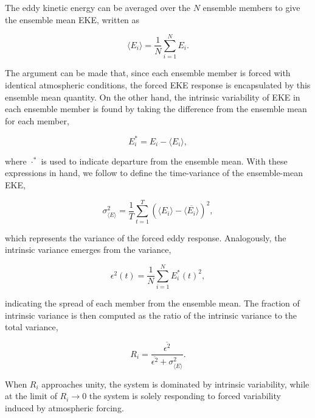 \documentclass[linenumbers]{agujournal2019}
\begin{document}
The eddy kinetic energy can be averaged over the $N$ ensemble members to give the ensemble mean EKE, written as
\begin{linenomath*}
\begin{equation}
\langle E_i \rangle = \frac{1}{N} \sum_{i=1}^N E_i.
\end{equation}
\end{linenomath*}
The argument can be made that, since each ensemble member is forced with identical atmospheric conditions, the forced EKE response is encapsulated by this ensemble mean quantity.
On the other hand, the intrinsic variability of EKE in each ensemble member is found by taking the difference from the ensemble mean for each member,
\begin{linenomath*}
\begin{equation}
E_i^* = E_i - \langle E_i \rangle,
\end{equation}
\end{linenomath*}
where $\cdot^*$ is used to indicate departure from the ensemble mean.
With these expressions in hand, we follow \citet{Leroux2018} to define the  time-variance of the ensemble-mean EKE,
\begin{linenomath*}
\begin{equation}
\sigma^2_{\langle E \rangle} = \frac{1}{T} \sum_{t=1}^T \left(\langle E_i \rangle -  \overline{\langle E_i \rangle}\right)^2,
\end{equation}
\end{linenomath*}
which represents the variance of the forced eddy response.
Analogously, the intrinsic variance emerges from the variance,
\begin{linenomath*}
\begin{equation}
\epsilon^2(t) = \frac{1}{N} \sum_{i=1}^N E_i^*(t)^2,
\end{equation}
\end{linenomath*}
indicating the spread of each member from the ensemble mean.
The fraction of intrinsic variance is then computed as the ratio of the intrinsic variance to the total variance,
\begin{linenomath*}
\begin{equation}
R_i =  \frac{\overline{\epsilon^2}}{\overline{\epsilon^2} + \sigma^2_{\langle E \rangle}}.
\end{equation}
\end{linenomath*}
When $R_i$ approaches unity, the system is dominated by intrinsic variability, while at the limit  of $R_i \to 0$ the system is solely responding to forced variability induced by atmospheric forcing.
\end{document}
